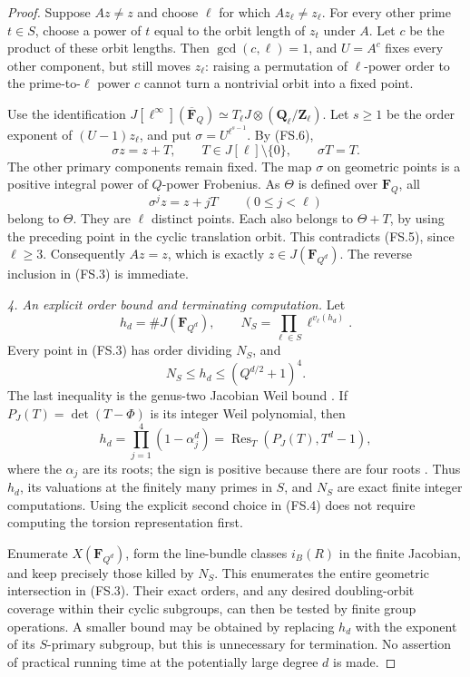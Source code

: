 \begin{proof}
Suppose $Az\ne z$ and choose $\ell$ for which
$Az_\ell\ne z_\ell$. For every other prime $t\in S$, choose
a power of $t$ equal to the orbit length of $z_t$ under $A$.
Let $c$ be the product of these orbit lengths. Then
$\gcd(c,\ell)=1$, and $U=A^c$ fixes every other component,
but still moves $z_\ell$: raising a permutation of
$\ell$-power order to the prime-to-$\ell$ power $c$ cannot
turn a nontrivial orbit into a fixed point.

Use the identification
$J[\ell^\infty](\overline{\mathbf F}_Q)
 \simeq T_\ell J\otimes(\mathbf Q_\ell/\mathbf Z_\ell)$.
Let $s\ge1$ be the order exponent of $(U-1)z_\ell$, and put
$\sigma=U^{\ell^{s-1}}$. By (FS.6),
\[
                      \sigma z=z+T,
 \qquad T\in J[\ell]\setminus\{0\},\qquad \sigma T=T.
                                                               \tag{FS.7}
\]
The other primary components remain fixed. The map $\sigma$
on geometric points is a positive integral power of $Q$-power
Frobenius. As $\Theta$ is defined over $\mathbf F_Q$, all
\[
                \sigma^jz=z+jT\qquad(0\le j<\ell)
\]
belong to $\Theta$. They are $\ell$ distinct points. Each also
belongs to $\Theta+T$, by using the preceding point in the
cyclic translation orbit. This contradicts (FS.5), since
$\ell\ge3$. Consequently $Az=z$, which is exactly
$z\in J(\mathbf F_{Q^d})$. The reverse inclusion in (FS.3)
is immediate.

\emph{4. An explicit order bound and terminating computation.}
Let
\[
 h_d=\#J(\mathbf F_{Q^d}),\qquad
 N_S=\prod_{\ell\in S}\ell^{v_\ell(h_d)}.
                                                               \tag{FS.8}
\]
Every point in (FS.3) has order dividing $N_S$, and
\[
                 N_S\le h_d\le(Q^{d/2}+1)^4.                 \tag{FS.9}
\]
The last inequality is the genus-two Jacobian Weil bound
\cite[Theorem~19.1(c)]{MilneAV}.
If $P_J(T)=\det(T-\Phi)$ is its integer Weil polynomial, then
\[
 h_d=\prod_{j=1}^4(1-\alpha_j^d)
       =\operatorname{Res}_T(P_J(T),T^d-1),                 \tag{FS.10}
\]
where the $\alpha_j$ are its roots; the sign is positive
because there are four roots
\cite[Theorem~19.1(b)]{MilneAV}.
Thus $h_d$, its valuations at the finitely many primes in
$S$, and $N_S$ are exact finite integer computations.
Using the explicit second choice in (FS.4) does not require
computing the torsion representation first.

Enumerate $X(\mathbf F_{Q^d})$, form the line-bundle classes
$i_B(R)$ in the finite Jacobian, and keep precisely those killed
by $N_S$. This enumerates the entire geometric intersection
in (FS.3). Their exact orders, and any desired doubling-orbit
coverage within their cyclic subgroups, can then be tested by
finite group operations. A smaller bound may be obtained by
replacing $h_d$ with the exponent of its $S$-primary subgroup,
but this is unnecessary for termination. No assertion of
practical running time at the potentially large degree $d$ is made.
\end{proof}

